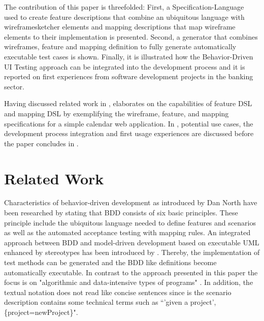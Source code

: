 \documentclass{sig-alternate-05-2015}
\begin{document}
The contribution of this paper is threefolded:
First, a Specification-Language used to create feature descriptions that combine an ubiquitous language with wireframesketcher elements \cite{Wireframesketcher} and mapping descriptions that map wireframe elements to their implementation is presented.
Second, a generator that combines wireframes, feature and mapping definition to fully generate automatically executable test cases is shown.
Finally, it is illustrated how the Behavior-Driven UI Testing approach can be integrated into the development process and it is reported on first experiences from software development projects in the banking sector.

Having discussed related work in ,  elaborates on the capabilities of feature DSL and mapping DSL by exemplifying the wireframe, feature, and mapping specifications for a simple calendar web application.
In , potential use cases, the development process integration and first usage experiences are discussed before the paper concludes in .


\section{Related Work}\label{sec:RelatedWork}
Characteristics of behavior-driven development as introduced by Dan North \cite{DanNorth} have been researched by \cite{C.Solis.2011} stating that BDD consists of six basic principles.
These principle include the ubiquitous language needed to define features and scenarios as well as the automated acceptance testing with mapping rules.
An integrated approach between BDD and model-driven development based on executable UML enhanced by stereotypes has been introduced by \cite{IoanLazar.2010}.
Thereby, the implementation of test methods can be generated and the BDD like definitions become automatically executable.
In contrast to the approach presented in this paper the focus is on "algorithmic and data-intensive types of programs" \cite{IoanLazar.2010}.
In addition, the textual notation does not read like concise sentences since is the scenario description contains some technical terms such as ``'given a project',\{project=newProject\}".
\end{document}

